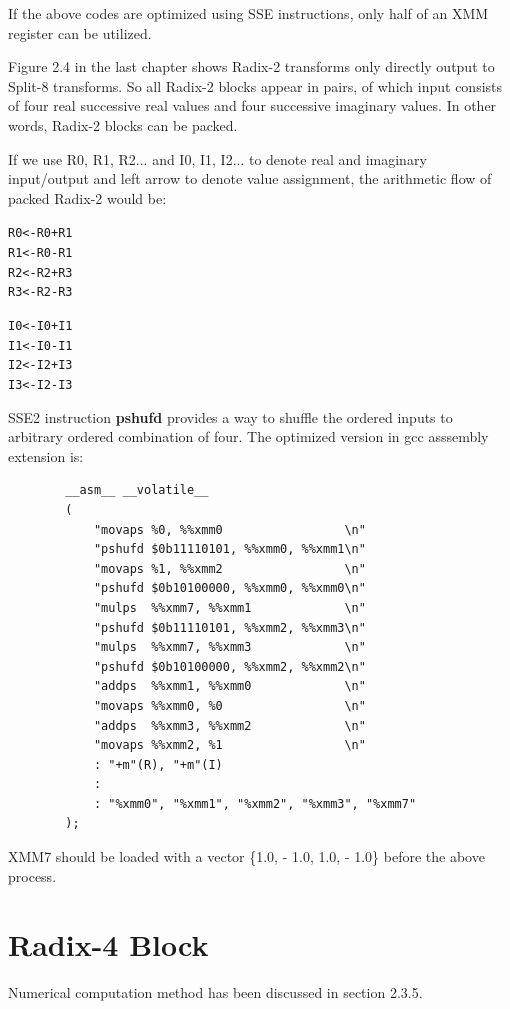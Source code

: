 \documentclass[a4paper]{report}
\begin{document}
	If the above codes are optimized using SSE instructions, only half of an XMM register can be utilized.
	
	Figure 2.4 in the last chapter shows Radix-2 transforms only directly output to Split-8 transforms. So all Radix-2 blocks appear in pairs, of which input consists of four real successive real values and four successive imaginary values. In other words, Radix-2 blocks can be packed.

	If we use R0, R1, R2... and I0, I1, I2... to denote real and imaginary input/output and left arrow to denote value assignment, the arithmetic flow of packed Radix-2 would be:

\begin{alltt}
\centering
R0 <- R0 + R1
R1 <- R0 - R1
R2 <- R2 + R3
R3 <- R2 - R3

I0 <- I0 + I1
I1 <- I0 - I1
I2 <- I2 + I3
I3 <- I2 - I3
\end{alltt}

	SSE2 instruction \textbf{pshufd} provides a way to shuffle the ordered inputs to arbitrary ordered combination of four. The optimized version in gcc asssembly extension is:

    \lstset{language = c, tabsize = 4}
    \begin{lstlisting}
        __asm__ __volatile__
        (
            "movaps %0, %%xmm0                 \n"
            "pshufd $0b11110101, %%xmm0, %%xmm1\n"
            "movaps %1, %%xmm2                 \n"
            "pshufd $0b10100000, %%xmm0, %%xmm0\n"
            "mulps  %%xmm7, %%xmm1             \n"
            "pshufd $0b11110101, %%xmm2, %%xmm3\n"
            "mulps  %%xmm7, %%xmm3             \n"
            "pshufd $0b10100000, %%xmm2, %%xmm2\n"
            "addps  %%xmm1, %%xmm0             \n"
            "movaps %%xmm0, %0                 \n"
            "addps  %%xmm3, %%xmm2             \n"
            "movaps %%xmm2, %1                 \n"
            : "+m"(R), "+m"(I)
            :
            : "%xmm0", "%xmm1", "%xmm2", "%xmm3", "%xmm7"
        );
    \end{lstlisting}
    
    XMM7 should be loaded with a vector \{1.0, - 1.0, 1.0, - 1.0\} before the above process.

\section{Radix-4 Block} \indent

	Numerical computation method has been discussed in section 2.3.5.
\end{document}
